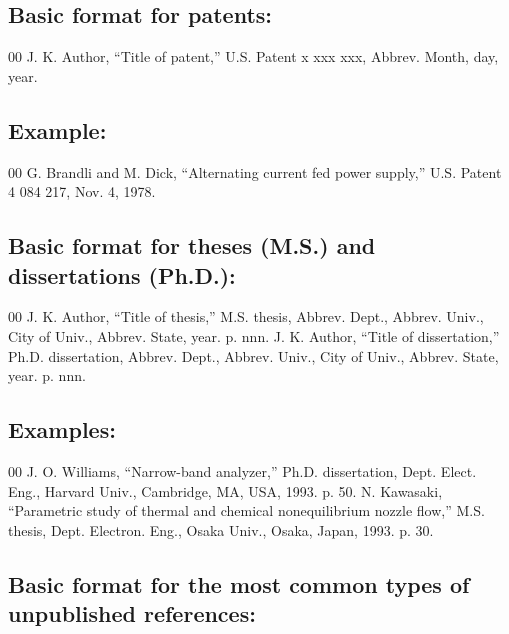 \documentclass{IEEEtran}
\begin{document}
\subsection*{Basic format for patents:}

\begin{thebibliography}{00}
 J. K. Author, ``Title of patent,'' U.S. Patent {x xxx xxx}, Abbrev. Month, day, year.
\end{thebibliography}

\subsection*{Example:}

\begin{thebibliography}{00}
 G. Brandli and M. Dick, ``Alternating current fed power supply,'' U.S. Patent 4 084 217, Nov. 4, 1978.
\end{thebibliography}

\subsection*{Basic format for theses (M.S.) and dissertations (Ph.D.):}

\begin{thebibliography}{00}
 J. K. Author, ``Title of thesis,'' M.S. thesis, Abbrev. Dept., Abbrev.
Univ., City of Univ., Abbrev. State, year. p. nnn.
 J. K. Author, ``Title of dissertation,'' Ph.D. dissertation, Abbrev.
Dept., Abbrev. Univ., City of Univ., Abbrev. State, year. p. nnn.
\end{thebibliography}

\subsection*{Examples:}

\begin{thebibliography}{00}
 J. O. Williams, ``Narrow-band analyzer,'' Ph.D. dissertation, Dept. Elect. Eng., Harvard Univ., Cambridge, MA, USA, 1993. p. 50.
 N. Kawasaki, ``Parametric study of thermal and chemical nonequilibrium nozzle flow,'' M.S. thesis, Dept. Electron. Eng., Osaka Univ., Osaka, Japan, 1993. p. 30.
\end{thebibliography}

\subsection*{Basic format for the most common types of unpublished references:}
\end{document}
